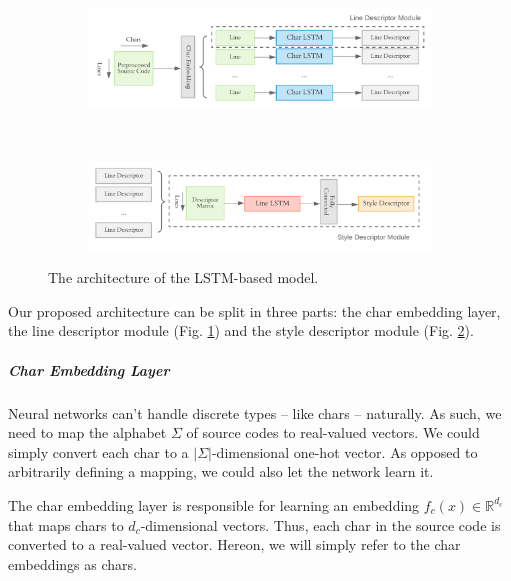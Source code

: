 \begin{figure}[htbp]
	\centering
	\begin{subfigure}[t]{\textwidth}
		\includegraphics[width=\linewidth]{imgs/lstm_char_level.pdf}
		\label{fig:lstm_architecture:a}
	\end{subfigure}%
	\\
	\begin{subfigure}[t]{\textwidth}
		\includegraphics[width=\linewidth]{imgs/lstm_line_level.pdf}
		\label{fig:lstm_architecture:b}
	\end{subfigure}%
	\caption{The architecture of the LSTM-based model.}
	\label{fig:lstm_architecture}
\end{figure}

Our proposed architecture can be split in three parts: the char embedding layer, the line descriptor module (Fig. \ref{fig:lstm_architecture:a}) and the style descriptor module (Fig. \ref{fig:lstm_architecture:b}).

\subparagraph*{Char Embedding Layer}

Neural networks can't handle discrete types -- like chars -- naturally. As such, we need to map the alphabet $\Sigma$ of source codes to real-valued vectors. We could simply convert each char to a $|\Sigma|$-dimensional one-hot vector. As opposed to arbitrarily defining a mapping, we could also let the network learn it. 

The char embedding layer is responsible for learning an embedding $f_c(x) \in \mathbb{R}^{d_c}$ that maps chars to $d_c$-dimensional vectors. Thus, each char in the source code is converted to a real-valued vector. Hereon, we will simply refer to the char embeddings as chars.

